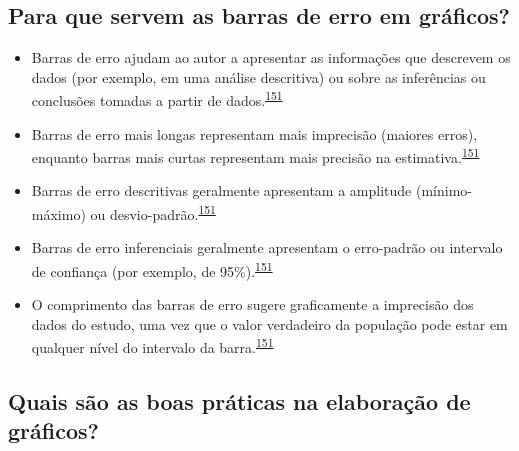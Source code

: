 \documentclass[
  a4paper,
]{book}
\begin{document}
\hypertarget{para-que-servem-as-barras-de-erro-em-gruxe1ficos}{%
\subsection{Para que servem as barras de erro em gráficos?}\label{para-que-servem-as-barras-de-erro-em-gruxe1ficos}}

\begin{itemize}
\item
  Barras de erro ajudam ao autor a apresentar as informações que descrevem os dados (por exemplo, em uma análise descritiva) ou sobre as inferências ou conclusões tomadas a partir de dados.\textsuperscript{\protect\hyperlink{ref-Cumming2007}{151}}
\item
  Barras de erro mais longas representam mais imprecisão (maiores erros), enquanto barras mais curtas representam mais precisão na estimativa.\textsuperscript{\protect\hyperlink{ref-Cumming2007}{151}}
\item
  Barras de erro descritivas geralmente apresentam a amplitude (mínimo-máximo) ou desvio-padrão.\textsuperscript{\protect\hyperlink{ref-Cumming2007}{151}}
\item
  Barras de erro inferenciais geralmente apresentam o erro-padrão ou intervalo de confiança (por exemplo, de 95\%).\textsuperscript{\protect\hyperlink{ref-Cumming2007}{151}}
\item
  O comprimento das barras de erro sugere graficamente a imprecisão dos dados do estudo, uma vez que o valor verdadeiro da população pode estar em qualquer nível do intervalo da barra.\textsuperscript{\protect\hyperlink{ref-Cumming2007}{151}}
\end{itemize}

\hypertarget{quais-suxe3o-as-boas-pruxe1ticas-na-elaborauxe7uxe3o-de-gruxe1ficos}{%
\subsection{Quais são as boas práticas na elaboração de gráficos?}\label{quais-suxe3o-as-boas-pruxe1ticas-na-elaborauxe7uxe3o-de-gruxe1ficos}}
\end{document}
